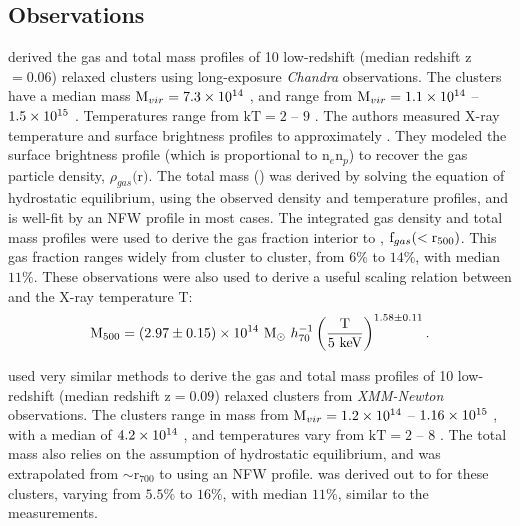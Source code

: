 \subsection{Observations}
\label{sec:Gas.Observations}
\textbf{\citet{Vikhlinin2006}} derived the gas and total mass profiles
of 10 low-redshift (median redshift z$ = 0.06$) relaxed clusters using
long-exposure \textit{Chandra} observations. The clusters have a
median mass $\textrm{M\ensuremath{_{vir}}} = 7.3 \times 10^{14}$ \Msun, and range from $\textrm{M\ensuremath{_{vir}}} =
1.1\times 10^{14}$ -- $1.5 \times 10^{15}$ \Msun. Temperatures range from $\textrm{kT}
= 2$ -- $9$ \keV. The authors measured X-ray temperature and surface
brightness profiles to approximately \rfive{}. They modeled the
surface brightness profile (which is proportional to n$_e$n$_p$) to
recover the gas particle density, $\rho_{gas}($r$)$. The total mass
(\Mfive) was derived by solving the equation of hydrostatic
equilibrium, using the observed density and temperature profiles, and
is well-fit by an NFW profile in most cases. The integrated gas
density and total mass profiles were used to derive the gas fraction
interior to \rfive{}, $\textrm{f\ensuremath{_{gas}}}(<\textrm{r\ensuremath{_{500}}})$. This gas fraction ranges widely
from cluster to cluster, from $6\%$ to $14\%$, with median
$11\%$. These observations were also used to derive a useful scaling
relation between \Mfive{} and the X-ray temperature T:
\begin{equation}
\label{eq:M-T}
\textrm{M\ensuremath{_{500}}}{} = (2.97 \pm 0.15)\times10^{14}~\textrm{M}_\odot~h_{70}^{-1}
\left(\frac{\textrm{T}}{5~\textrm{keV}}\right)^{1.58 \pm 0.11}.
\end{equation}

\textbf{\citet{Arnaud2007}} used very similar methods to derive the
gas and total mass profiles of 10 low-redshift (median redshift z$ =
0.09$) relaxed clusters from \textit{XMM-Newton} observations. The
clusters range in mass from $\textrm{M\ensuremath{_{vir}}} = 1.2\times 10^{14}$ -- $1.16 \times 10^{15}$ \Msun,
with a median of $4.2 \times 10^{14}$ \Msun, and temperatures vary from
$\textrm{kT} = 2$ -- $8$ \keV. The total mass also relies on
the assumption of hydrostatic equilibrium, and was extrapolated from
$\sim$r$_{700}$ to \rfive{} using an NFW profile.  \fg{} was derived
out to \rfive{} for these clusters, varying from $5.5\%$ to $16\%$,
with median $11\%$, similar to the \citet{Vikhlinin2006} measurements.

